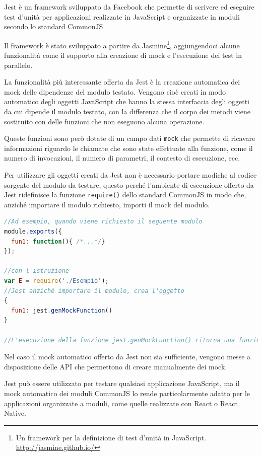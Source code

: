 Jest è un framework sviluppato da Facebook che permette di scrivere ed eseguire test d'unità per applicazioni realizzate in JavaScript e organizzate in moduli secondo lo standard CommonJS.

Il framework è stato sviluppato a partire da Jasmine\footnote{Un framework per la definizione di test d'unità in JavaScript. \url{http://jasmine.github.io/}}, aggiungendoci alcune funzionalità come il supporto alla creazione di mock e l'esecuzione dei test in parallelo.

La funzionalità più interessante offerta da Jest è la creazione automatica dei mock delle dipendenze del modulo testato. Vengono cioè creati in modo automatico degli oggetti JavaScript che hanno la stessa interfaccia degli oggetti da cui dipende il modulo testato, con la differenza che il corpo dei metodi viene sostituito con delle funzioni che non eseguono alcuna operazione.

Queste funzioni sono però dotate di un campo dati \texttt{mock} che permette di ricavare informazioni riguardo le chiamate che sono state effettuate alla funzione, come il numero di invocazioni, il numero di parametri, il contesto di esecuzione, ecc.

Per utilizzare gli oggetti creati da Jest non è necessario portare modiche al codice sorgente del modulo da testare, questo perché l'ambiente di esecuzione offerto da Jest ridefinisce la funzione \texttt{require()} dello standard CommonJS in modo che, anziché importare il modulo richiesto, importi il mock del modulo.

\begin{lstlisting}[language=JavaScript, caption=Esempio di mock creato da Jest]
//Ad esempio, quando viene richiesto il seguente modulo
module.exports({
  fun1: function(){ /*...*/}
});

//con l'istruzione
var E = require('./Esempio');
//Jest anziché importare il modulo, crea l'oggetto
{
  fun1: jest.genMockFunction()
}

//L'esecuzione della funzione jest.genMockFunction() ritorna una funzione con il corpo vuoto e con un campo dati .mock che, durante l'esecuzione del test, andrà a contenere le informazioni riguardo le varie invocazioni della funzione.
\end{lstlisting}

Nel caso il mock automatico offerto da Jest non sia sufficiente, vengono messe a disposizione delle API che permettono di creare manualmente dei mock.

Jest può essere utilizzato per testare qualsiasi applicazione JavaScript, ma il mock automatico dei moduli CommonJS lo rende particolarmente adatto per le applicazioni organizzate a moduli, come quelle realizzate con React o React Native.